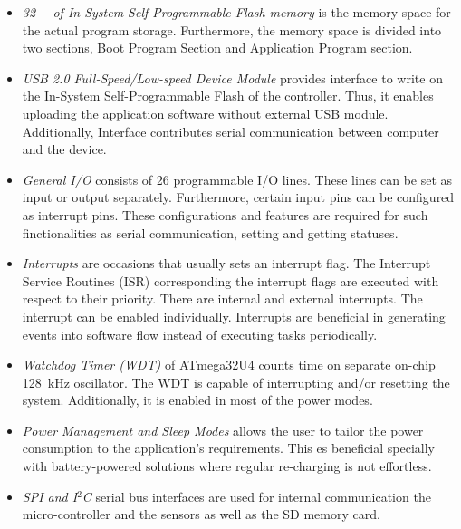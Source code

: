 \documentclass[english,12pt,a4paper,pdftex,elec,utf8]{aaltothesis}
\begin{document}
\begin{itemize}
\item \textit{\SI{32}{\kilo\byte} of In-System Self-Programmable Flash memory} is the memory space for the actual program storage. Furthermore, the memory space is divided into two sections, Boot Program Section and Application Program section. 

\item \textit{USB 2.0 Full-Speed/Low-speed Device Module} provides interface to write on the In-System Self-Programmable Flash of the controller. Thus, it enables uploading the application software without external USB module. Additionally, Interface contributes serial communication between computer and the device.

\item \textit{General I/O} consists of 26 programmable I/O lines. These lines can be set as input or output separately. Furthermore, certain input pins can be configured as interrupt pins. These configurations and features are required for such finctionalities as serial communication, setting and getting statuses.

\item \textit{Interrupts} are occasions that usually sets an interrupt flag. The Interrupt Service Routines (ISR) corresponding the interrupt flags are executed with respect to their priority. There are internal and external interrupts. The interrupt can be enabled individually. Interrupts are beneficial in generating events into software flow instead of executing tasks periodically.

\item \textit{Watchdog Timer (WDT)} of ATmega32U4 counts time on separate on-chip \SI{128}{\kilo \hertz} oscillator. The WDT is capable of interrupting and/or resetting the system. Additionally, it is enabled in most of the power modes. 


\item \textit{Power Management and Sleep Modes} allows the user to tailor the power consumption to the application's requirements. This es beneficial specially with battery-powered solutions where regular re-charging is not effortless.

\item \textit{SPI and I$^2$C} serial bus interfaces are used for internal communication the micro-controller and the sensors as well as the SD memory card.

\end{itemize}
\end{document}
